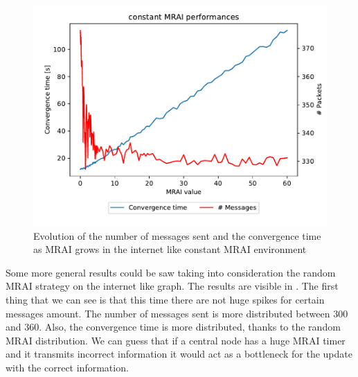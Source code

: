 \documentclass[10pt,conference,letterpaper]{IEEEtran}
\newcommand{\figwidth}{0.78}
\newcommand{\figvspace}{-1.5em}
\begin{document}
\begin{figure}[tb]
	\centering
	\includegraphics[width=\figwidth\columnwidth]{images/internet_like/graph-100-constant/mrai_evolution}
	\caption{Evolution of the number of messages sent and the convergence time as \ac{MRAI} grows
		in the internet like constant \ac{MRAI} environment}
	\label{fig:constant_mrai_evolution}
	\vspace{\figvspace}
\end{figure}

Some more general results could be saw taking into consideration the random \ac{MRAI}
strategy on the internet like graph.
The results are visible in .
The first thing that we can see is that this time there are not huge spikes 
for certain messages amount.
The number of messages sent is more distributed between \num{300} and \num{360}.
Also, the convergence time is more distributed, thanks to the random \ac{MRAI} distribution.
We can guess that if a central node has a huge \ac{MRAI} timer and it transmits
incorrect information it would act as a bottleneck for the update with the 
correct information.
\end{document}
